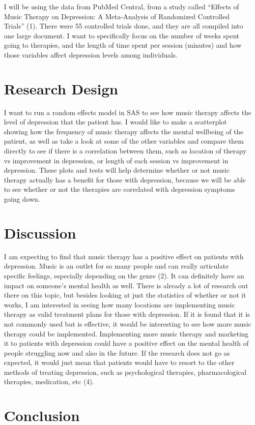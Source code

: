 \documentclass[12pt]{article}
\begin{document}
 I will be using the data from PubMed Central, from a study called “Effects of Music Therapy on Depression: A Meta-Analysis of Randomized Controlled Trials” (1). There were 55 controlled trials done, and they are all compiled into one large document. I want to specifically focus on the number of weeks spent going to therapies, and the length of time spent per session (minutes) and how those variables affect depression levels among individuals.


 \section{Research Design}
 \label{sec:research}

 I want to run a random effects model in SAS to see how music therapy affects the level of depression that the patient has. I would like to make a scatterplot showing how the frequency of music therapy affects the mental wellbeing of the patient, as well as take a look at some of the other variables and compare them directly to see if there is a correlation between them, such as location of therapy vs improvement in depression, or length of each session vs improvement in depression. These plots and tests will help determine whether or not music therapy actually has a benefit for those with depression, because we will be able to see whether or not the therapies are correlated with depression symptoms going down.

 \section{Discussion}
 \label{sec:disc}

 I am expecting to find that music therapy has a positive effect on patients with depression. Music is an outlet for so many people and can really articulate specific feelings, especially depending on the genre (2). It can definitely have an impact on someone’s mental health as well. There is already a lot of research out there on this topic, but besides looking at just the statistics of whether or not it works, I am interested in seeing how many locations are implementing music therapy as valid treatment plans for those with depression. If it is found that it is not commonly used but is effective, it would be interesting to see how more music therapy could be implemented. Implementing more music therapy and marketing it to patients with depression could have a positive effect on the mental health of people struggling now and also in the future. If the research does not go as expected, it would just mean that patients would have to resort to the other methods of treating depression, such as psychological therapies, pharmacological therapies, medication, etc (4).

 \section{Conclusion}
 \label{sec:con}
 

 
 
\end{document}
